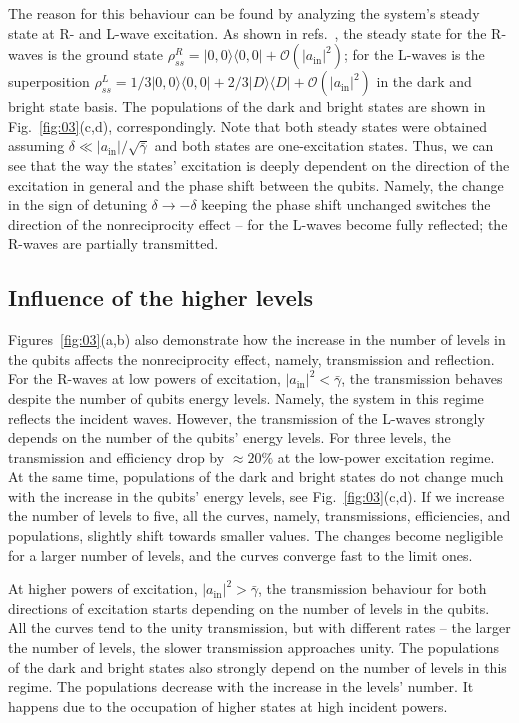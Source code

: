 \documentclass[lettersize,journal]{IEEEtran}
\begin{document}
The reason for this behaviour can be found by analyzing the system's steady state at R- and L-wave excitation.
As shown in refs.~\cite{muller_nonreciprocal_2017, rosario_hamann_rectangular_2019, Nefedkin2022}, the steady state for the R-waves is the ground state $\rho_{ss}^R = |0,0\rangle \langle0,0| + \mathcal{O}(|a_\mathrm{in}|^2)$; for the L-waves is the superposition $\rho_{ss}^L = 1/3 |0,0\rangle \langle0,0| + 2/3 |D \rangle \langle D| + \mathcal{O}(|a_\mathrm{in}|^2)$ in the dark and bright state basis.
The populations of the dark and bright states are shown in Fig.~\ref{fig:03}(c,d), correspondingly.
Note that both steady states were obtained assuming $\delta \ll |a_\mathrm{in}|/\sqrt{\bar{\gamma}}$ and both states are one-excitation states.
Thus, we can see that the way the states' excitation is deeply dependent on the direction of the excitation in general and the phase shift between the qubits.
Namely, the change in the sign of detuning $\delta \rightarrow - \delta$ keeping the phase shift unchanged switches the direction of the nonreciprocity effect -- for the L-waves become fully reflected; the R-waves are partially transmitted.

\subsection{Influence of the higher levels}

Figures~\ref{fig:03}(a,b) also demonstrate how the increase in the number of levels in the qubits affects the nonreciprocity effect, namely, transmission and reflection.
For the R-waves at low powers of excitation, $|a_\mathrm{in}|^2 < \bar{\gamma}$, the transmission behaves despite the number of qubits energy levels.
Namely, the system in this regime reflects the incident waves.
However, the transmission of the L-waves strongly depends on the number of the qubits' energy levels.
For three levels, the transmission and efficiency drop by $\approx 20 \%$ at the low-power excitation regime.
At the same time, populations of the dark and bright states do not change much with the increase in the qubits' energy levels, see Fig.~\ref{fig:03}(c,d).
If we increase the number of levels to five, all the curves, namely, transmissions, efficiencies, and populations, slightly shift towards smaller values.
The changes become negligible for a larger number of levels, and the curves converge fast to the limit ones.

At higher powers of excitation, $|a_\mathrm{in}|^2 > \bar{\gamma}$, the transmission behaviour for both directions of excitation starts depending on the number of levels in the qubits.
All the curves tend to the unity transmission, but with different rates -- the larger the number of levels, the slower transmission approaches unity.
The populations of the dark and bright states also strongly depend on the number of levels in this regime.
The populations decrease with the increase in the levels' number.
It happens due to the occupation of higher states at high incident powers.
\end{document}
